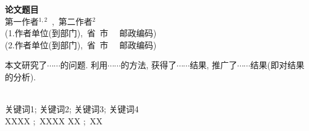 \documentclass[A4paper,11pt,onecolumn,twoside]{ctexart}
\begin{document}
%
%


\vspace{4mm}\hspace{-8mm}
\parbox{\textwidth}{
\begin{center}
\Large{\textbf{论文题目 }}\\
\vspace{4mm}
\textsc{第一作者$^{1,2}$~,~第二作者$^{2}$}\\[2pt]
({1.作者单位(到部门),~省~市~~ 邮政编码})\\[2pt]
({2.作者单位(到部门),~省~市~~ 邮政编码})\\[2pt]
\end{center}

\mbox{}\quad
本文研究了$\cdots\cdots$的问题. 利用$\cdots\cdots$的方法,
获得了$\cdots\cdots$结果,
推广了$\cdots\cdots$结果(即对结果的分析).}\\
\mbox{}\quad 关键词1; 关键词2; 关键词3; 关键词4\\
\mbox{}\quad
XXXX ;~XXXX
\mbox{}\quad XX
;~XX


\clearpage
\end{document}
